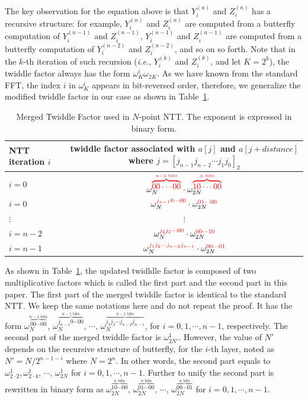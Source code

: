 \documentclass{iacrtrans}
\theoremstyle{plain}
\begin{document}
The key observation for the equation above is that $Y_i^{(n)}$ and $Z_i^{(n)}$ has a recursive structure: for example, $Y_i^{(n)}$ and $Z_i^{(n)}$ are computed from a butterfly computation of  $Y_i^{(n-1)}$ and $Z_i^{(n-1)}$, $Y_i^{(n-1)}$ and $Z_i^{(n-1)}$ are computed from a butterfly computation of $Y_i^{(n-2)}$ and $Z_i^{(n-2)}$, and so on so forth. Note that in the $k$-th iteration of such recursion (\textit{i.e.}, $Y_i^{(k)}$ and $Z_i^{(k)}$, and let $K=2^k$), the twiddle factor always has the form $\omega_K^i\omega_{2K}$. As we have known from the standard FFT, the index $i$ in $\omega_K^i$ appears in bit-reversed order, therefore, we generalize the modified twiddle factor in our case as shown in Table~\ref{table:merged_tf}.
\begin{table}\centering
\begin{tabular}{lc}
 \hline
 NTT iteration $i$ & \makecell{twiddle factor associated with $a[j]$ and\\ $a[j+distance]$ where $j=[j_{n-1}j_{n-2}\cdots j_{1}j_{0}]_2$}\\
 \hline
 $i=0$ & $\omega_{N}^{\textcolor{red}{\overbrace{00\cdots00}^{n-1 \text{ bits}}}}\cdot \omega_{2N}^{\textcolor{red}{\overbrace{10\cdots00}^{n \text{ bits}}}}$\\
 $i=0$ & $\omega_{N}^{\textcolor{red}{j_{n-1}0\cdots 00}}\cdot\omega_{2N}^{\textcolor{red}{01\cdots 00}}$ \\
 $\vdots$ & $\vdots$ \\
 $i=n-2$ & $\omega_{N}^{\textcolor{red}{j_{2}j_{3}\cdots 00}}\cdot \omega_{2N}^{\textcolor{red}{00\cdots 10}}$\\
 $i=n-1$ & $\omega_{N}^{\textcolor{red}{j_{1}j_{2}\cdots j_{n-2}j_{n-1}}}\cdot \omega_{2N}^{\textcolor{red}{00\cdots 01}}$\\
 \hline
 \end{tabular}

   \caption{Merged Twiddle Factor used in $N$-point NTT. The exponent is expressed in binary form.}
  \label{table:merged_tf}
 \end{table}

 As shown in Table~\ref{table:merged_tf}, the updated twidldle factor is composed of two multiplicative factors which is called the first part and the second part in this paper. The first part of the merged twiddle factor is identical to the standard NTT. We keep the same notations here and do not repeat the proof. It has the form $\omega_{N}^{\overbrace{00\cdots 00}^{n-1 \text{ bits}}}$, $\omega_{N}^{\overbrace{j_{n-1}0\cdots 00}^{n-1 \text{ bits}}}$, $\cdots$, $\omega_{N}^{\overbrace{j_1j_2\cdots j_{n-2}j_{n-1}}^{n-1 \text{ bits}}}$, for $i=0,1,\cdots,n-1$, respectively.
The second part of the merged twiddle factor is $\omega_{2N'}^1$. However, the value of $N'$ depends on the recursive structure of butterfly, for the $i$-th layer, noted as $N'=N/2^{n-1-i}$ where $N=2^n$. In other words, the second part equals to $\omega_{2\cdot 2}^1, \omega_{2\cdot 4}^1$, $\cdots$, $\omega_{2N}^1$ for $i=0,1,\cdots,n-1$. Further to unify the second part is rewritten in binary form as $\omega_{2N}^{\overbrace{10\cdots 00}^{n\text{ bits}}}$, $\omega_{2N}^{\overbrace{01\cdots 00}^{n\text{ bits}}}$, $\cdots$, $\omega_{2N}^{\overbrace{00\cdots 01}^{n\text{ bits}}}$ for $i=0,1,\cdots,n-1$.
\end{document}
